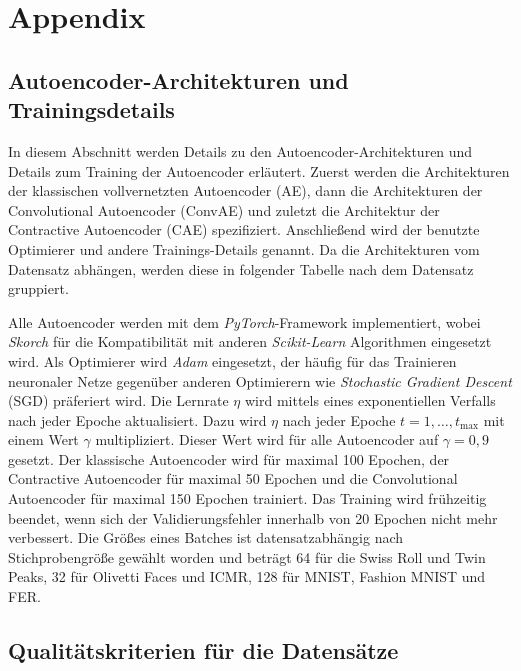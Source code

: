 
\chapter{Appendix}
\label{ch:Appendix}

\section{Autoencoder-Architekturen und Trainingsdetails}
\label{ch:Appendix:Architektur-Details}
In diesem Abschnitt werden Details zu den Autoencoder-Architekturen und Details zum Training der Autoencoder erläutert. Zuerst werden die Architekturen der klassischen vollvernetzten Autoencoder (AE), dann die Architekturen der Convolutional Autoencoder (ConvAE) und zuletzt die Architektur der Contractive Autoencoder (CAE) spezifiziert. Anschließend wird der benutzte Optimierer und andere Trainings-Details genannt. Da die Architekturen
vom Datensatz abhängen, werden diese in folgender Tabelle nach dem Datensatz gruppiert.





Alle Autoencoder werden mit dem \textit{PyTorch}-Framework implementiert, wobei \textit{Skorch} für
die Kompatibilität mit anderen \textit{Scikit-Learn} Algorithmen eingesetzt wird. Als Optimierer
wird \textit{Adam} eingesetzt, der häufig für das Trainieren neuronaler Netze gegenüber anderen
Optimierern wie \textit{Stochastic Gradient Descent} (SGD) präferiert wird. Die Lernrate $\eta$
wird mittels eines exponentiellen Verfalls nach jeder Epoche aktualisiert. Dazu wird $\eta$ nach
jeder Epoche $t = 1, \ldots, t_{\text{max}}$ mit einem Wert $\gamma$ multipliziert. Dieser Wert
wird für alle Autoencoder auf $\gamma = 0,9$ gesetzt. Der klassische Autoencoder wird für maximal
100 Epochen, der Contractive Autoencoder für maximal 50 Epochen und die Convolutional Autoencoder
für maximal 150 Epochen trainiert. Das Training wird frühzeitig beendet, wenn sich der
Validierungsfehler innerhalb von 20 Epochen nicht mehr verbessert. Die Größes eines Batches ist
datensatzabhängig nach Stichprobengröße gewählt worden und beträgt 64 für die Swiss Roll und Twin
Peaks, 32 für Olivetti Faces und ICMR, 128 für MNIST, Fashion MNIST und FER.

\section{Qualitätskriterien für die Datensätze}
\label{ch:Appendix:Qualitaetskriterien}

